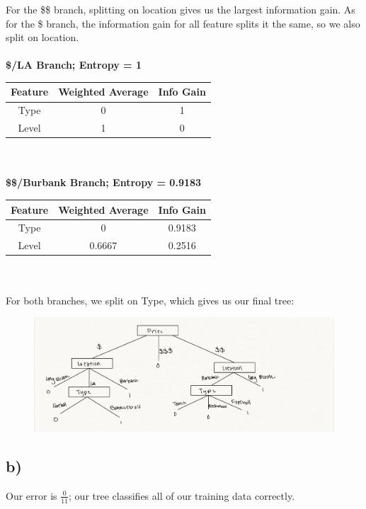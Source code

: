 \documentclass[12pt, letterpaper]{article}
\begin{document}
For the \$\$ branch, splitting on location gives us the largest information gain. As for the \$ branch, the information gain for all feature splits it the same, so we also split on location.\\\\

\textbf{\$/LA Branch; Entropy = 1}\\
 \begin{tabular}{ |c|c|c| } 
\hline
 \textbf{Feature} & \textbf{Weighted Average} & \textbf{Info Gain} \\ 
\hline
Type & 0 & 1 \\ 
\hline
Level & 1 & 0 \\ 
 \hline
\end{tabular}\\\\

\textbf{\$\$/Burbank Branch; Entropy = 0.9183}\\
 \begin{tabular}{ |c|c|c| } 
\hline
 \textbf{Feature} & \textbf{Weighted Average} & \textbf{Info Gain} \\ 
\hline
Type & 0 & 0.9183 \\ 
\hline
Level & 0.6667 & 0.2516 \\ 
 \hline
\end{tabular}\\\\

For both branches, we split on Type, which gives us our final tree:\\
\begin{figure}[h!]
  \includegraphics[scale=0.3]{./images/2a}
\end{figure}

\subsection*{b)} Our error is $\frac{0}{11}$; our tree classifies all of our training data correctly.
\end{document}
